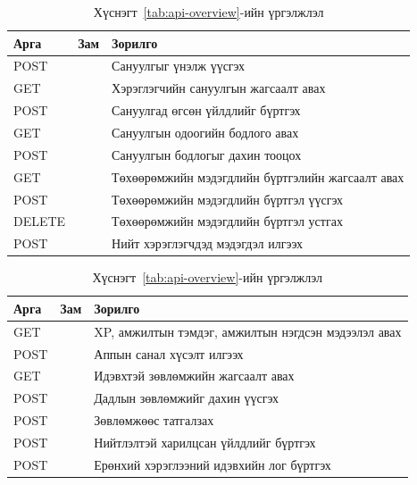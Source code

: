 {\begin{table}[H]
\centering
\scriptsize
\caption*{Хүснэгт~\ref{tab:api-overview}-ийн үргэлжлэл}
\begin{tabular}{L{1.25cm}L{7.0cm}L{4.4cm}}
\toprule
\textbf{Арга} & \textbf{Зам} & \textbf{Зорилго} \\
\midrule
POST  &  & Сануулгыг үнэлж үүсгэх \\
GET   &  & Хэрэглэгчийн сануулгын жагсаалт авах \\
POST  &  & Сануулгад өгсөн үйлдлийг бүртгэх \\
GET   &  & Сануулгын одоогийн бодлого авах \\
POST  &  & Сануулгын бодлогыг дахин тооцох \\
GET   &  & Төхөөрөмжийн мэдэгдлийн бүртгэлийн жагсаалт авах \\
POST  &  & Төхөөрөмжийн мэдэгдлийн бүртгэл үүсгэх \\
DELETE &  & Төхөөрөмжийн мэдэгдлийн бүртгэл устгах \\
POST  &  & Нийт хэрэглэгчдэд мэдэгдэл илгээх \\
\bottomrule
\end{tabular}
\end{table}

\begin{table}[H]
\centering
\scriptsize
\caption*{Хүснэгт~\ref{tab:api-overview}-ийн үргэлжлэл}
\begin{tabular}{L{1.25cm}L{7.0cm}L{4.4cm}}
\toprule
\textbf{Арга} & \textbf{Зам} & \textbf{Зорилго} \\
\midrule
GET   &  & XP, амжилтын тэмдэг, амжилтын нэгдсэн мэдээлэл авах \\
POST  &  & Аппын санал хүсэлт илгээх \\
GET   &  & Идэвхтэй зөвлөмжийн жагсаалт авах \\
POST  &  & Дадлын зөвлөмжийг дахин үүсгэх \\
POST  &  & Зөвлөмжөөс татгалзах \\
POST  &  & Нийтлэлтэй харилцсан үйлдлийг бүртгэх \\
POST  &  & Ерөнхий хэрэглээний идэвхийн лог бүртгэх \\
\bottomrule
\end{tabular}
\end{table}
}

